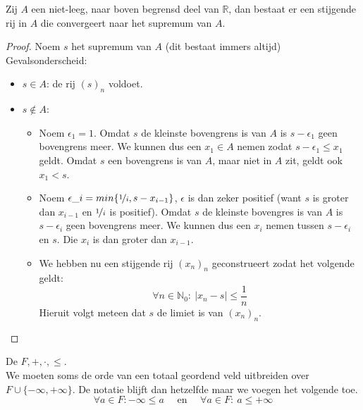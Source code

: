 \documentclass[main.tex]{subfiles}
\begin{document}
\begin{pr}
  Zij $A$ een niet-leeg, naar boven begrensd deel van $\mathbb{R}$, dan bestaat er een stijgende rij in $A$ die convergeert naar het supremum van $A$.
  
  \begin{proof}
    Noem $s$ het supremum van $A$ (dit bestaat immers altijd)
    Gevalsonderscheid:
    \begin{itemize}
    \item $s\in A$: de rij $(s)_{n}$ voldoet.
    \item $s\not \in A$:\\
      \begin{itemize}
      \item Noem $\epsilon_{1} = 1$.  Omdat $s$ de kleinste bovengrens
        is van $A$ is $s-\epsilon_{1}$ geen bovengrens meer.  We
        kunnen dus een $x_{1}\in A$ nemen zodat $s-\epsilon_{1} \le
        x_{1}$ geldt.  Omdat $s$ een bovengrens is van $A$, maar niet
        in $A$ zit, geldt ook $x_{1}< s$.
      \item Noem $\epsilon\_{i} = min\{ \nicefrac{1}{i}, s-x_{i-1} \}$,
        $\epsilon$ is dan zeker positief (want $s$ is groter dan $x_{i-1}$ en $\nicefrac{1}{i}$ is positief).
        Omdat $s$ de kleinste bovengres is van $A$ is $s-\epsilon_{i}$ geen bovengrens meer.
        We kunnen dus een $x_{i}$ nemen tussen $s-\epsilon_{i}$ en $s$.
        Die $x_{i}$ is dan groter dan $x_{i-1}$.\waarom

      \item We hebben nu een stijgende rij $(x_{n})_{n}$ geconstrueert zodat het volgende geldt:
        \[ \forall n\in \mathbb{N}_{0}:\ |x_{n}-s| \le \frac{1}{n} \]
        Hieruit volgt meteen dat $s$ de limiet is van $(x_{n})_{n}$.\waarom
      \end{itemize}
    \end{itemize}
  \end{proof}
\end{pr}

\begin{de}
  De  $F,+,\cdot,\le$.\\
  We moeten soms de orde van een totaal geordend veld uitbreiden over $F \cup \{ -\infty,+\infty\}$.
  De notatie blijft dan hetzelfde maar we voegen het volgende toe.
  \[ \forall a\in F: -\infty \le a \quad\text{ en }\quad \forall a \in F:\ a \le +\infty \]
\end{de}
\end{document}
